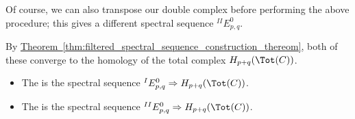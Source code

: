 \documentclass[main.tex]{subfiles}
\begin{document}
Of course, we can also transpose our double complex before performing the above procedure; this gives a different spectral sequence $^{II}E^{0}_{p,q}$.

By \hyperref[thm:filtered_spectral_sequence_construction_thereom]{Theorem~\ref*{thm:filtered_spectral_sequence_construction_thereom}}, both of these converge to the homology of the total complex $H_{p+q}(\Tot(C))$.

\begin{definition}
  \label{def:spectral_sequences_associated_to_a_double_complex}
  \leavevmode
  \begin{itemize}
    \item The  is the spectral sequence $^{I}E^{0}_{p, q} \Rightarrow H_{p+q}(\Tot(C))$.

    \item The  is the spectral sequence $^{II}E^{0}_{p, q} \Rightarrow H_{p+q}(\Tot(C))$.
  \end{itemize}
\end{definition}
\end{document}
